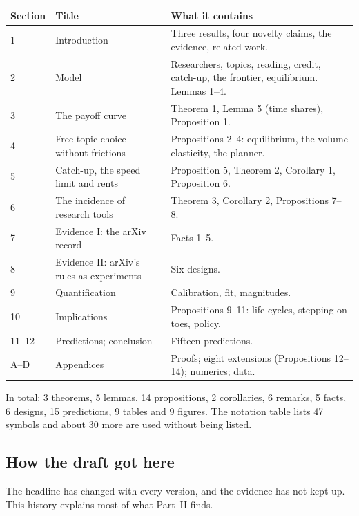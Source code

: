 \begin{center}\small
\begin{tabularx}{\textwidth}{@{}P{0.9in}P{1.55in}L@{}}
\toprule
Section & Title & What it contains \\
 & Introduction & Three results, four novelty claims, the evidence, related work. \\
2 & Model & Researchers, topics, reading, credit, catch-up, the frontier, equilibrium. Lemmas 1--4. \\
3 & The payoff curve & Theorem 1, Lemma 5 (time shares), Proposition 1. \\
4 & Free topic choice without frictions & Propositions 2--4: equilibrium, the volume elasticity, the planner. \\
5 & Catch-up, the speed limit and rents & Proposition 5, Theorem 2, Corollary 1, Proposition 6. \\
6 & The incidence of research tools & Theorem 3, Corollary 2, Propositions 7--8. \\
7 & Evidence I: the arXiv record & Facts 1--5. \\
8 & Evidence II: arXiv's rules as experiments & Six designs. \\
9 & Quantification & Calibration, fit, magnitudes. \\
10 & Implications & Propositions 9--11: life cycles, stepping on toes, policy. \\
11--12 & Predictions; conclusion & Fifteen predictions. \\
A--D & Appendices & Proofs; eight extensions (Propositions 12--14); numerics; data. \\
\bottomrule
\end{tabularx}
\end{center}

In total: 3 theorems, 5 lemmas, 14 propositions, 2 corollaries, 6 remarks, 5 facts, 6 designs, 15 predictions, 9 tables and 9 figures. The notation table lists 47 symbols and about 30 more are used without being listed.

\subsection{How the draft got here}

The headline has changed with every version, and the evidence has not kept up. This history explains most of what Part~II finds.

